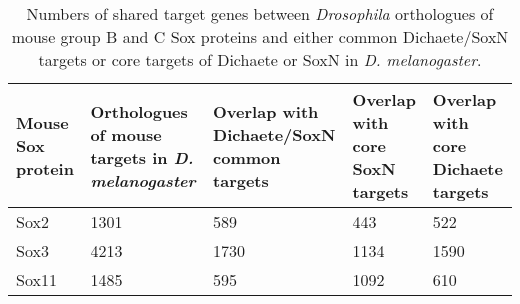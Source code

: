 \begin{table}[h]
\centering
\begin{tabular}{|p{2.3cm}|p{2.7cm}|p{3.0cm}|p{2.4cm}|p{2.4cm}|}
\hline
\textbf{Mouse Sox protein} & \textbf{Orthologues of mouse targets in \emph{D. melanogaster}} & \textbf{Overlap with Dichaete/SoxN common targets} & \textbf{Overlap with core SoxN targets} & \textbf{Overlap with core Dichaete targets} \\ \hline
Sox2              & 1301                                            & 589                                       & 443                            & 522                                \\ \hline
Sox3              & 4213                                            & 1730                                      & 1134                           & 1590                               \\ \hline
Sox11             & 1485                                            & 595                                       & 1092                           & 610                                \\ \hline
\end{tabular}
\caption{Numbers of shared target genes between \emph{Drosophila} orthologues of mouse group B and C Sox proteins and either common Dichaete/SoxN targets or core targets of Dichaete or SoxN in \emph{D. melanogaster}.}
\label{Table 5.2}
\end{table}


